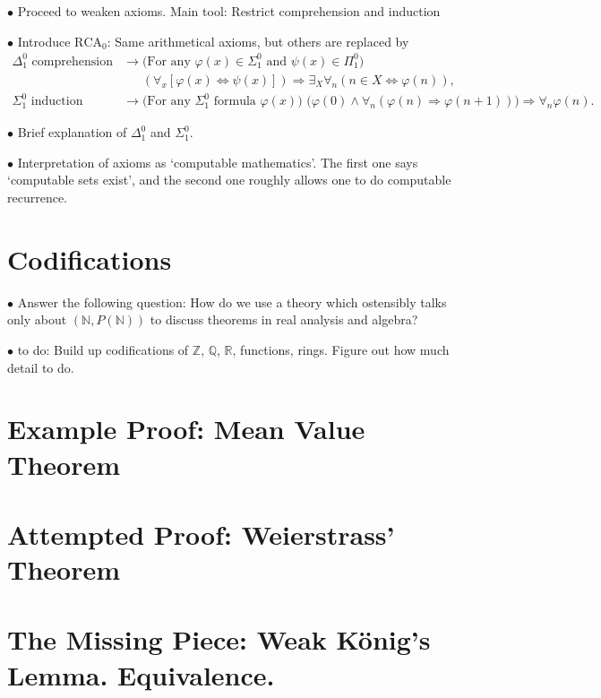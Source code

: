 \documentclass{article}
\theoremstyle{nonumberplain}
\newcommand{\N}{\mathbb{N}}
\newcommand{\Z}{\mathbb{Z}}
\newcommand{\Q}{\mathbb{Q}}
\newcommand{\R}{\mathbb{R}}
\newcommand{\RCA}{\mathrm{RCA}}
\newcommand\point[1]{\noindent \hspace{\labelsep} $\bullet$ #1 \smallskip}
\begin{document}
\point{Proceed to weaken axioms. Main tool: Restrict comprehension and induction}

\point{Introduce $\RCA_0$: Same arithmetical axioms, but others are replaced by}
\begin{equation}
\begin{aligned}
\text{$\Delta^0_1$ comprehension} &\rightarrow \text{(For any $\varphi(x) \in \Sigma^0_1$ and $\psi(x) \in \Pi^0_1$)}\\
&\mathrel{\phantom{\rightarrow}} (\forall_x [\varphi(x) \Leftrightarrow \psi(x)]) \Rightarrow \exists_X \forall_n (n \in X \Leftrightarrow \varphi(n)),\\
\text{$\Sigma^0_1$ induction} &\rightarrow \text{(For any $\Sigma^0_1$ formula $\varphi(x)$) } \big(\varphi(0) \land \forall_n (\varphi(n) \Rightarrow \varphi(n+1)) \big) \Rightarrow \forall_n \varphi(n).
\end{aligned}
\end{equation}

\point{Brief explanation of $\Delta^0_1$ and $\Sigma^0_1$.}

\point{Interpretation of axioms as `computable mathematics'. The first one says `computable sets exist', and the second one roughly allows one to do computable recurrence.}

\section{Codifications}

\point{Answer the following question: How do we use a theory which ostensibly talks only about $(\N,P(\N))$ to discuss theorems in real analysis and algebra?}

\point{to do: Build up codifications of $\Z$, $\Q$, $\R$, functions, rings. Figure out how much detail to do.}

\section{Example Proof: Mean Value Theorem}

\section{Attempted Proof: Weierstrass' Theorem}

\section{The Missing Piece: Weak König's Lemma. Equivalence.}
\end{document}
